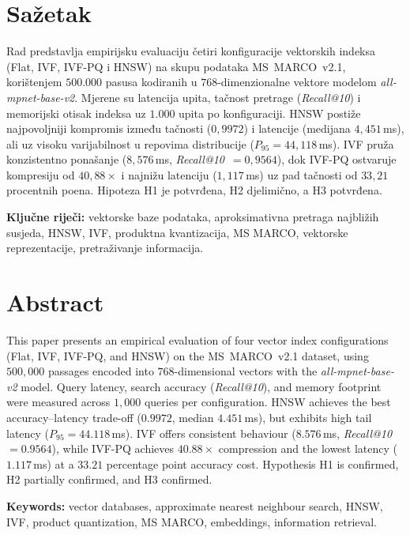 
\newpage
\thispagestyle{plain}

\section*{Sažetak}

Rad predstavlja empirijsku evaluaciju četiri konfiguracije vektorskih
indeksa (Flat, IVF, IVF-PQ i HNSW) na skupu podataka MS~MARCO~v2.1,
korištenjem $500{.}000$ pasusa kodiranih u $768$-dimenzionalne vektore
modelom \textit{all-mpnet-base-v2}. Mjerene su latencija upita,
tačnost pretrage (\textit{Recall@10}) i memorijski otisak indeksa
uz $1{.}000$ upita po konfiguraciji. HNSW postiže najpovoljniji
kompromis između tačnosti ($0{,}9972$) i latencije (medijana
$4{,}451$\,ms), ali uz visoku varijabilnost u repovima distribucije
($P_{95} = 44{,}118$\,ms). IVF pruža konzistentno ponašanje
($8{,}576$\,ms, \textit{Recall@10}~$= 0{,}9564$), dok IVF-PQ
ostvaruje kompresiju od $40{,}88\times$ i najnižu latenciju
($1{,}117$\,ms) uz pad tačnosti od $33{,}21$ procentnih poena.
Hipoteza H1 je potvrđena, H2 djelimično, a H3 potvrđena.

\medskip
\noindent\textbf{Ključne riječi:}
vektorske baze podataka,
aproksimativna pretraga najbližih susjeda,
HNSW, IVF, produktna kvantizacija,
MS MARCO, vektorske reprezentacije,
pretraživanje informacija.


\section*{Abstract}

This paper presents an empirical evaluation of four vector index
configurations (Flat, IVF, IVF-PQ, and HNSW) on the MS~MARCO~v2.1
dataset, using $500{,}000$ passages encoded into $768$-dimensional
vectors with the \textit{all-mpnet-base-v2} model. Query latency,
search accuracy (\textit{Recall@10}), and memory footprint were
measured across $1{,}000$ queries per configuration. HNSW achieves
the best accuracy--latency trade-off ($0.9972$, median $4.451$\,ms),
but exhibits high tail latency ($P_{95} = 44.118$\,ms). IVF offers
consistent behaviour ($8.576$\,ms, \textit{Recall@10}~$= 0.9564$),
while IVF-PQ achieves $40.88\times$ compression and the lowest
latency ($1.117$\,ms) at a $33.21$ percentage point accuracy cost.
Hypothesis H1 is confirmed, H2 partially confirmed, and H3 confirmed.

\medskip
\noindent\textbf{Keywords:}
vector databases,
approximate nearest neighbour search,
HNSW, IVF, product quantization,
MS MARCO, embeddings,
information retrieval.
